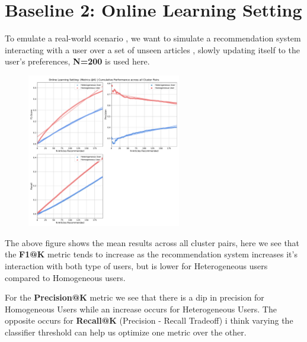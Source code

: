 \documentclass[a4paper,fontsize=9.0pt]{scrartcl}
\begin{document}
\vspace{-1ex}
\section{Baseline 2: Online Learning Setting}
\begin{flushleft}
To emulate a real-world scenario , we want to simulate a recommendation system interacting with a user over a set of unseen articles , slowly updating itself to the user's preferences, \textbf{N=200} is used here.
\end{flushleft}
\vspace{-3ex}
\begin{figure}[H]
 \includegraphics[width=0.6\textwidth]{Graphs/user_interaction_vs_model_performance_cumu.pdf}
\end{figure}
\begin{flushleft}
The above figure shows the mean results across all cluster pairs, here we see that the \textbf{F1@K} metric tends to increase as the recommendation system increases it's interaction with both type of users, but is lower for Heterogeneous users compared to Homogeneous users.
\end{flushleft}
\begin{flushleft}
For the \textbf{Precision@K} metric we see that there is a dip in precision for Homogeneous Users while an increase occurs for Heterogeneous Users. The opposite occurs for \textbf{Recall@K} (Precision - Recall Tradeoff) i think varying  the classifier threshold can help us optimize one metric over the other.
\end{flushleft}


\vspace{-1ex}
\end{document}
